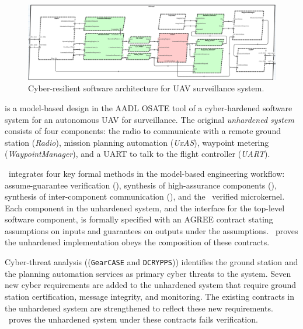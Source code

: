 \begin{figure}
	\begin{center}
	  \includegraphics[width=2\columnwidth]{./figs/sw-hardened.png}
  \end{center}
	\caption{Cyber-resilient software architecture for UAV surveillance system.} 
	\label{fig:sw-hardened} 
\end{figure}

 is a model-based design in the AADL OSATE tool of a cyber-hardened software system for an autonomous UAV for surveillance.
The original \emph{unhardened system} consists of four components: the radio to communicate with a remote ground
station (\emph{Radio}), mission planning automation (\emph{UxAS}), waypoint metering (\emph{WaypointManager}), and a UART to talk to the flight controller (\emph{UART}).

\briefcase\ integrates four key formal methods in the model-based engineering workflow: assume-guarantee verification (\agree), synthesis of high-assurance components (\splat), synthesis of inter-component communication (\hamr), and the \selFour\ verified microkernel.
Each component in the unhardened system, and the interface for the top-level software component, is formally specified with an AGREE contract stating assumptions on inputs and guarantees on outputs under the assumptions.
\agree\ proves the unhardened implementation obeys the composition of these contracts. 

Cyber-threat analysis ((\texttt{GearCASE} and \texttt{DCRYPPS})) identifies the ground station and the planning automation services as primary cyber threats to the system.
Seven new cyber requirements are added to the unhardened system that require ground station certification, message integrity, and monitoring.
The existing contracts in the unhardened system are strengthened to reflect these new requirements.
\agree\ proves the unhardened system under these contracts fails verification. 


